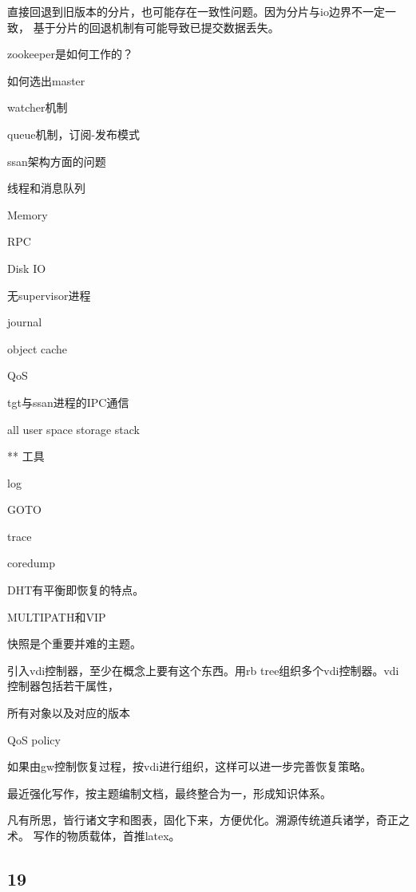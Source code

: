 直接回退到旧版本的分片，也可能存在一致性问题。因为分片与io边界不一定一致，
基于分片的回退机制有可能导致已提交数据丢失。

\hrulefill

zookeeper是如何工作的？
\begin{enumbox}
\item 如何选出master
\item watcher机制
\item queue机制，订阅-发布模式
\end{enumbox}

ssan架构方面的问题
\begin{enumbox}
\item 线程和消息队列
\item Memory
\item RPC
\item Disk IO
\item 无supervisor进程
\item journal
\item object cache
\item QoS
\item tgt与ssan进程的IPC通信
\item all user space storage stack
\item *** 工具
\item log
\item GOTO
\item trace
\item coredump
\end{enumbox}

DHT有平衡即恢复的特点。

MULTIPATH和VIP

快照是个重要并难的主题。

引入vdi控制器，至少在概念上要有这个东西。用rb tree组织多个vdi控制器。vdi控制器包括若干属性，
\begin{enumbox}
\item 所有对象以及对应的版本
\item QoS policy
\end{enumbox}

如果由gw控制恢复过程，按vdi进行组织，这样可以进一步完善恢复策略。

最近强化写作，按主题编制文档，最终整合为一，形成知识体系。

凡有所思，皆行诸文字和图表，固化下来，方便优化。溯源传统道兵诸学，奇正之术。
写作的物质载体，首推latex。

\subsection{19}

